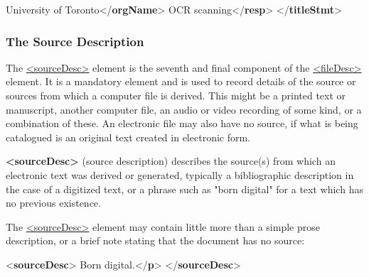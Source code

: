 \begin{shaded}
\mbox{}\newline 
\hspace*{1em}University of Toronto{</\textbf{orgName}>}\mbox{}\newline 
\hspace*{1em}OCR scanning{</\textbf{resp}>}\mbox{}\newline 
{}\mbox{}\newline 
{</\textbf{titleStmt}>}\end{shaded}\egroup\par \noindent 
\subsubsection[{The Source Description}]{The Source Description}\label{HD3}\par
The \hyperref[TEI.sourceDesc]{<sourceDesc>} element is the seventh and final component of the \hyperref[TEI.fileDesc]{<fileDesc>} element. It is a mandatory element and is used to record details of the source or sources from which a computer file is derived. This might be a printed text or manuscript, another computer file, an audio or video recording of some kind, or a combination of these. An electronic file may also have no source, if what is being catalogued is an original text created in electronic form. 
\begin{sansreflist}
  
\item [\textbf{<sourceDesc>}] (source description) describes the source(s) from which an electronic text was derived or generated, typically a bibliographic description in the case of a digitized text, or a phrase such as "born digital" for a text which has no previous existence.
\end{sansreflist}
\par
The \hyperref[TEI.sourceDesc]{<sourceDesc>} element may contain little more than a simple prose description, or a brief note stating that the document has no source: \par\bgroup{}\exampleFont \begin{shaded}\noindent\mbox{}{<\textbf{sourceDesc}>}\mbox{}\newline 
{}Born digital.{</\textbf{p}>}\mbox{}\newline 
{</\textbf{sourceDesc}>}\end{shaded}\egroup\par \par
